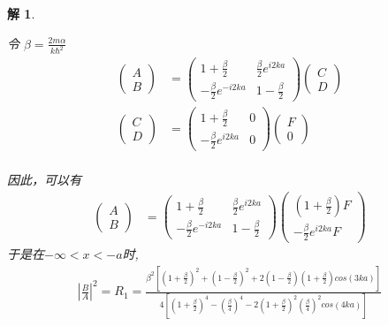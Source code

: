 \documentclass{article}
\newtheorem{solution}{解}
\newcommand{\pmtwo}[4]{
    \begin{pmatrix}
        #1&#2\\
        #3&#4
    \end{pmatrix}
    }
\newcommand{\D}[2]{\frac{d}{d#2}#1}
\begin{document}
\begin{solution}
\begin{enumerate}
\begin{enumerate}
            
                令 $\beta=\frac{2m\alpha}{k\hbar^{2}}$ 
                \begin{align*}
                    \begin{pmatrix}
                        A\\B
                    \end{pmatrix}
                    &=\pmtwo{1+\frac{\beta}{2}}{\frac{\beta}{2}e^{i2ka}}{-\frac{\beta}{2}e^{-i2ka}}{1-\frac{\beta}{2}}
                    \begin{pmatrix}
                        C\\D
                    \end{pmatrix}\\
                    \begin{pmatrix}
                        C\\D
                    \end{pmatrix}
                    &=\pmtwo{1+\frac{\beta}{2}}{0}{-\frac{\beta}{2}e^{i2ka}}{0}
                    \begin{pmatrix}
                        F\\0
                    \end{pmatrix}\\
                \end{align*}
                
                因此，可以有
                \begin{align*}
                    \begin{pmatrix}
                        A\\B
                    \end{pmatrix}
                    &=\pmtwo{1+\frac{\beta}{2}}{\frac{\beta}{2}e^{i2ka}}{-\frac{\beta}{2}e^{-i2ka}}{1-\frac{\beta}{2}}
                    \begin{pmatrix}
                        \left(1+\frac{\beta}{2}\right)F\\-\frac{\beta}{2}e^{i2ka}F
                    \end{pmatrix}
                \end{align*}
                于是在$-\infty<x< -a$时, 
                \begin{align*}
                    |\frac{B}{A}|^{2}=R_{1}=\frac{\beta^2\left[(1+\frac{\beta}{2})^2+(1-\frac{\beta}{2})^2+2(1-\frac{\beta}{2})(1+\frac{\beta}{2}) cos(3ka)\right]}{4\left[\left(1+\frac{\beta}{2}\right)^4-\left(\frac{\beta}{4}\right)^4-2\left(1+\frac{\beta}{2}\right)^2\left(\frac{\beta}{4}\right)^2cos(4ka)\right]}
                \end{align*}
                

\end{enumerate}
\end{enumerate}
\end{solution}
\end{document}
